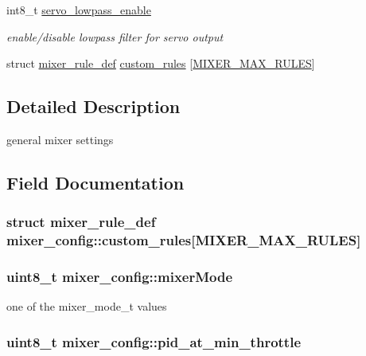 \begin{DoxyCompactItemize}
int8\+\_\+t \hyperlink{structmixer__config_a52ddd8fd52d3ec5b796b335cb8a42f6e}{servo\+\_\+lowpass\+\_\+enable}
\begin{DoxyCompactList}\small\item\em enable/disable lowpass filter for servo output \end{DoxyCompactList}\item 
struct \hyperlink{structmixer__rule__def}{mixer\+\_\+rule\+\_\+def} \hyperlink{structmixer__config_a9b4d6d41ac1d21566899593814328726}{custom\+\_\+rules} \mbox{[}\hyperlink{config_2mixer_8h_ad2d3d1183e486a6464565563724e33a5}{M\+I\+X\+E\+R\+\_\+\+M\+A\+X\+\_\+\+R\+U\+L\+E\+S}\mbox{]}
\end{DoxyCompactItemize}


\subsection{Detailed Description}
general mixer settings 

\subsection{Field Documentation}
\hypertarget{structmixer__config_a9b4d6d41ac1d21566899593814328726}{
\subsubsection[{custom\+\_\+rules}]{\setlength{\rightskip}{0pt plus 5cm}struct {\bf mixer\+\_\+rule\+\_\+def} mixer\+\_\+config\+::custom\+\_\+rules\mbox{[}{\bf M\+I\+X\+E\+R\+\_\+\+M\+A\+X\+\_\+\+R\+U\+L\+E\+S}\mbox{]}}}\label{structmixer__config_a9b4d6d41ac1d21566899593814328726}
\hypertarget{structmixer__config_a3ef00c251c808edf383b1114263202bf}{
\subsubsection[{mixer\+Mode}]{\setlength{\rightskip}{0pt plus 5cm}uint8\+\_\+t mixer\+\_\+config\+::mixer\+Mode}}\label{structmixer__config_a3ef00c251c808edf383b1114263202bf}


one of the mixer\+\_\+mode\+\_\+t values 

\hypertarget{structmixer__config_ab0bbe459d4fb13edc71ccc4fc92cb7d3}{
\subsubsection[{pid\+\_\+at\+\_\+min\+\_\+throttle}]{\setlength{\rightskip}{0pt plus 5cm}uint8\+\_\+t mixer\+\_\+config\+::pid\+\_\+at\+\_\+min\+\_\+throttle}}\label{structmixer__config_ab0bbe459d4fb13edc71ccc4fc92cb7d3}


